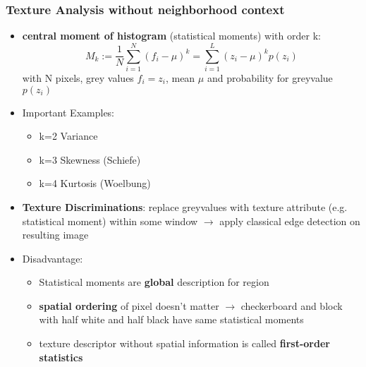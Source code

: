 \documentclass[11pt]{article}
\begin{document}
\subsubsection{Texture Analysis without neighborhood context}
\label{sec-2-7-1}
\begin{itemize}
\item \textbf{central moment of histogram} (statistical moments) with order k:
\[ M_k := \frac{1}{N}\sum_{i=1}^N(f_i-\mu)^k =
         \sum_{i=1}^L(z_i - \mu)^k p(z_i)\]
with N pixels, grey values $f_i = z_i$, mean $\mu$ and probability for greyvalue $p(z_i)$
\item Important Examples:
\begin{itemize}
\item k=2 Variance
\item k=3 Skewness (Schiefe)
\item k=4 Kurtosis (Woelbung)
\end{itemize}
\item \textbf{Texture Discriminations}: replace greyvalues with texture attribute 
(e.g. statistical moment) within some window $\rightarrow$ apply 
classical edge detection on resulting image
\item Disadvantage:
\begin{itemize}
\item Statistical moments are \textbf{global} description for region
\item \textbf{spatial ordering} of pixel doesn't matter $\rightarrow$ checkerboard and
block with half white and half black have same statistical moments
\item texture descriptor without spatial information is called \textbf{first-order statistics}
\end{itemize}
\end{itemize}
\end{document}
